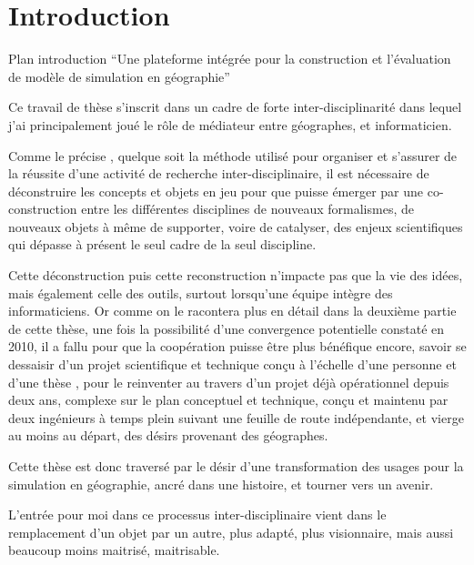 
\section{Introduction}
\label{sec:Introduction}


Plan introduction \enquote{Une plateforme intégrée pour la construction et l'évaluation de modèle de simulation en géographie}

Ce travail de thèse s'inscrit dans un cadre de forte inter-disciplinarité dans lequel j'ai principalement joué le rôle de médiateur entre géographes, et informaticien. 

Comme le précise \autocites{Pumain2005, Chapron2014}, quelque soit la méthode utilisé pour organiser et s'assurer de la réussite d'une activité de recherche inter-disciplinaire, il est nécessaire de déconstruire les concepts et objets en jeu pour que puisse émerger par une co-construction entre les différentes disciplines \autocite{Banos2013} de nouveaux formalismes, de nouveaux objets à même de supporter, voire de catalyser, des enjeux scientifiques qui dépasse à présent le seul cadre de la seul discipline.


Cette déconstruction puis cette reconstruction n'impacte pas que la vie des idées, mais également celle des outils, surtout lorsqu'une équipe intègre des informaticiens. Or comme on le racontera plus en détail dans la deuxième partie de cette thèse, une fois la possibilité d'une convergence potentielle constaté en 2010, il a fallu pour que la coopération puisse être plus bénéfique encore, savoir se dessaisir d'un projet scientifique et technique conçu à l'échelle d'une personne et d'une thèse \autocites{Rey2009, Louail2010}, pour le reinventer au travers d'un projet déjà opérationnel  depuis deux ans, complexe sur le plan conceptuel et technique, conçu et maintenu par deux ingénieurs à temps plein suivant une feuille de route indépendante, et vierge au moins au départ, des désirs provenant des géographes.

Cette thèse est donc traversé par le désir d'une transformation des usages pour la simulation en géographie, ancré dans une histoire, et tourner vers un avenir. 

L'entrée pour moi dans ce processus inter-disciplinaire vient dans le remplacement d'un objet par un autre, plus adapté, plus visionnaire, mais aussi beaucoup moins maitrisé, maitrisable. 


